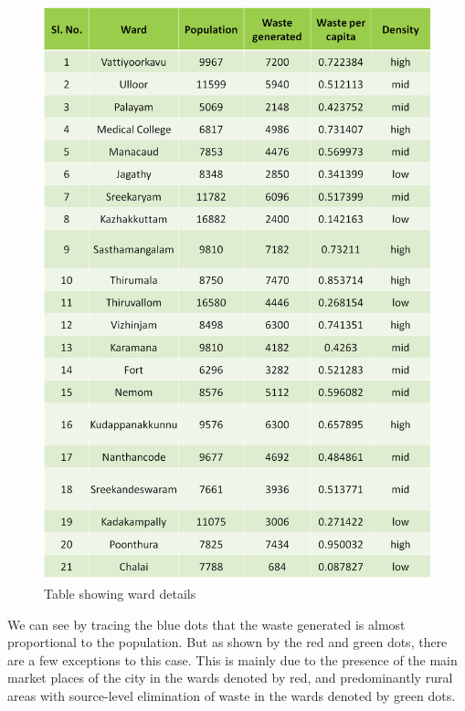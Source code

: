 \documentclass[12pt,a4paper]{report}
\begin{document}
\begin{figure}[H]
	\centering
	\includegraphics[width=1\linewidth]{table_waste_dens}
	\caption{Table showing ward details}
	\label{fig:tablewastedens}
\end{figure}

We can see by tracing the blue dots that the waste generated is almost proportional to the population. But as shown by the red and green dots, there are a few exceptions to this case. This is mainly due to the presence of the main market places of the city in the wards denoted by red, and predominantly rural areas with source-level elimination of waste in the wards denoted by green dots.
\end{document}
